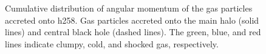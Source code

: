 \documentclass[manuscript]{aastex}
\begin{document}
\begin{figure}
\centerline{}
\caption[]{ Cumulative distribution of angular momentum of the gas particles accreted onto h258.  Gas particles accreted onto the main halo (solid lines) and central black hole (dashed lines). The green, blue, and red lines indicate clumpy, cold, and shocked gas, respectively.}
\label{h258angmom} 
\end{figure}
\end{document}
